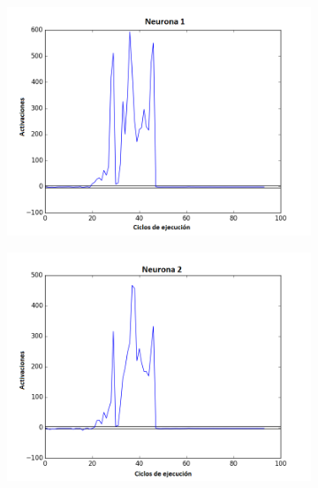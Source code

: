 \begin{figure}[!h]
    \centering %
\begin{subfigure}{0.33\textwidth}
  \includegraphics[width=\linewidth]{Imagenes/Agente2Activaciones/Agente4/Neurona0}
\end{subfigure}\hfil %
\begin{subfigure}{0.33\textwidth}
  \includegraphics[width=\linewidth]{Imagenes/Agente2Activaciones/Agente4/Neurona1}
\end{subfigure}\hfil %
\begin{subfigure}{0.33\textwidth}

\end{subfigure}
\end{figure}
